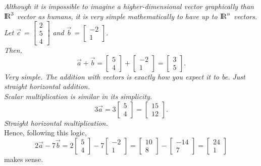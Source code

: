 \documentclass[addpoints]{exam}
\begin{document}
\pagebreak\textit{
Although it is impossible to imagine a higher-dimensional vector graphically than ${\rm I\!R}^3$ vector as humans, it is very simple mathematically to have up to ${\rm I\!R}^n$ vectors. Let $\vec{c}$ = \(\begin{bmatrix} 2\\5\\4\end{bmatrix}\) and $\vec{b}$ = \(\begin{bmatrix} -2\\1\end{bmatrix}\). \\Then, \begin{equation} \vec{a} +\vec{b} = \begin{bmatrix}5\\4\end{bmatrix} + \begin{bmatrix}-2\\1\end{bmatrix} = \begin{bmatrix} 3\\5\end{bmatrix}.\end{equation} Very simple. The addition with vectors is exactly how you expect it to be. Just straight horizontal addition.
}\\

\textit{
Scalar multiplication is similar in its simplicity. 
\begin{equation}
    3\vec{a} = 3\begin{bmatrix}5\\4\end{bmatrix} = \begin{bmatrix}15\\12\end{bmatrix}.
\end{equation}
Straight horizontal multiplication.
}\\

Hence, following this logic, 
\begin{equation}
    2\vec{a} - 7\vec{b}= 2\begin{bmatrix}5\\4\end{bmatrix} - 7\begin{bmatrix} -2\\1\end{bmatrix}= \begin{bmatrix}10\\8\end{bmatrix}-\begin{bmatrix}-14\\7\end{bmatrix}=\begin{bmatrix}24\\1\end{bmatrix}
\end{equation}
makes sense.
\end{document}
